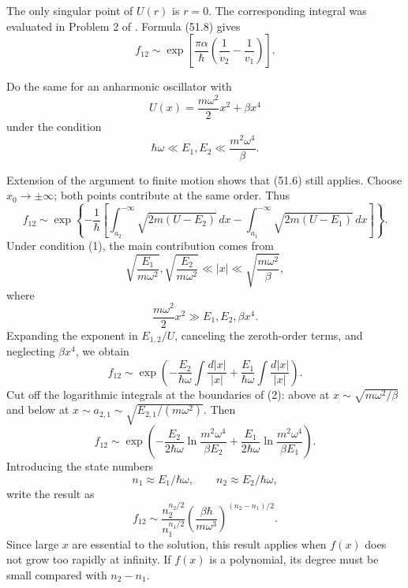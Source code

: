 \SolutionHeading The only singular point of $U(r)$ is $r=0$. The corresponding
integral was evaluated in Problem 2 of . Formula (51.8) gives
\[
 f_{12}\sim\exp\left[\frac{\pi\alpha}{\hbar}
 \left(\frac1{v_2}-\frac1{v_1}\right)\right].
\]

 Do the same for an anharmonic oscillator with
\[
 U(x)=\frac{m\omega^2}{2}x^2+\beta x^4
\]
under the condition
\begin{equation}
 \hbar\omega\ll E_1,E_2\ll\frac{m^2\omega^4}{\beta}. \tag{1}
\end{equation}

\SolutionHeading Extension of the argument to finite motion shows that (51.6)
still applies. Choose $x_0\to\pm\infty$; both points contribute at the same
order. Thus
\[
 f_{12}\sim\exp\left\{-\frac1\hbar\left[
 \int_{a_2}^{-\infty}\sqrt{2m(U-E_2)}\,dx-
 \int_{a_1}^{-\infty}\sqrt{2m(U-E_1)}\,dx\right]\right\}.
\]
Under condition (1), the main contribution comes from
\begin{equation}
 \sqrt{\frac{E_1}{m\omega^2}},\sqrt{\frac{E_2}{m\omega^2}}\ll|x|\ll
 \sqrt{\frac{m\omega^2}{\beta}}, \tag{2}
\end{equation}
where
\[
 \frac{m\omega^2}{2}x^2\gg E_1,E_2,\beta x^4.
\]
Expanding the exponent in $E_{1,2}/U$, canceling the zeroth-order terms, and
neglecting $\beta x^4$, we obtain
\[
 f_{12}\sim\exp\left(-\frac{E_2}{\hbar\omega}\int\frac{d|x|}{|x|}
 +\frac{E_1}{\hbar\omega}\int\frac{d|x|}{|x|}\right).
\]
Cut off the logarithmic integrals at the boundaries of (2): above at
$x\sim\sqrt{m\omega^2/\beta}$ and below at
$x\sim a_{2,1}\sim\sqrt{E_{2,1}/(m\omega^2)}$. Then
\[
 f_{12}\sim\exp\left(-\frac{E_2}{2\hbar\omega}\ln\frac{m^2\omega^4}{\beta E_2}
 +\frac{E_1}{2\hbar\omega}\ln\frac{m^2\omega^4}{\beta E_1}\right).
\]
Introducing the state numbers
\[
 n_1\approx E_1/\hbar\omega,\qquad n_2\approx E_2/\hbar\omega,
\]
write the result as
\[
 f_{12}\sim\frac{n_2^{n_2/2}}{n_1^{n_1/2}}
 \left(\frac{\beta\hbar}{m\omega^3}\right)^{(n_2-n_1)/2}.
\]
Since large $x$ are essential to the solution, this result applies when
$f(x)$ does not grow too rapidly at infinity. If $f(x)$ is a polynomial, its
degree must be small compared with $n_2-n_1$.
